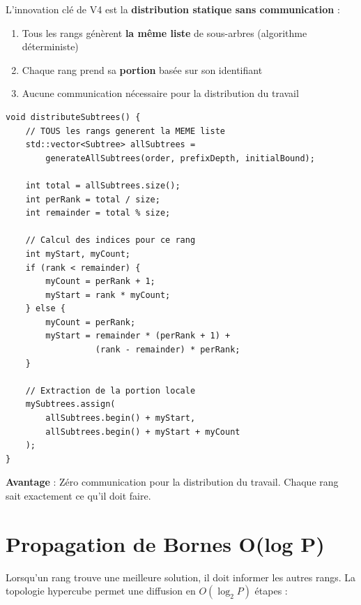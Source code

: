 \documentclass[12pt,a4paper,twoside]{report}
\begin{document}
L'innovation clé de V4 est la \textbf{distribution statique sans communication} :

\begin{enumerate}
    \item Tous les rangs génèrent \textbf{la même liste} de sous-arbres (algorithme déterministe)
    \item Chaque rang prend sa \textbf{portion} basée sur son identifiant
    \item Aucune communication nécessaire pour la distribution du travail
\end{enumerate}

\begin{lstlisting}[caption={Distribution statique des sous-arbres}]
void distributeSubtrees() {
    // TOUS les rangs generent la MEME liste
    std::vector<Subtree> allSubtrees =
        generateAllSubtrees(order, prefixDepth, initialBound);

    int total = allSubtrees.size();
    int perRank = total / size;
    int remainder = total % size;

    // Calcul des indices pour ce rang
    int myStart, myCount;
    if (rank < remainder) {
        myCount = perRank + 1;
        myStart = rank * myCount;
    } else {
        myCount = perRank;
        myStart = remainder * (perRank + 1) +
                  (rank - remainder) * perRank;
    }

    // Extraction de la portion locale
    mySubtrees.assign(
        allSubtrees.begin() + myStart,
        allSubtrees.begin() + myStart + myCount
    );
}
\end{lstlisting}

\textbf{Avantage} : Zéro communication pour la distribution du travail. Chaque rang sait exactement ce qu'il doit faire.

\section{Propagation de Bornes O(log P)}

Lorsqu'un rang trouve une meilleure solution, il doit informer les autres rangs. La topologie hypercube permet une diffusion en $O(\log_2 P)$ étapes :
\end{document}
